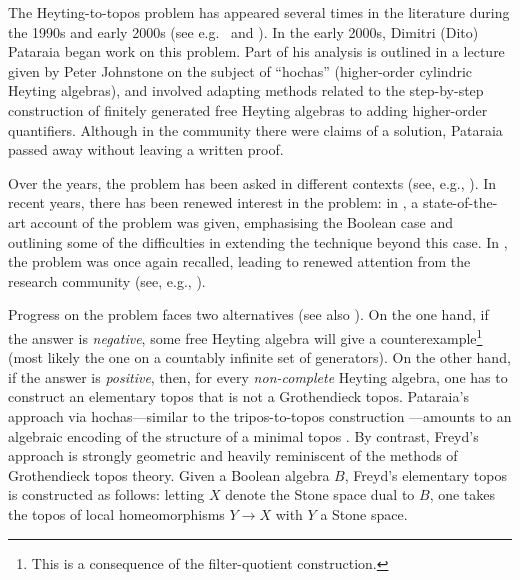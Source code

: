 \documentclass[12pt]{amsart}
\theoremstyle{plain}
\theoremstyle{definition}
\begin{document}
The Heyting-to-topos problem has appeared several times in the literature during the 1990s and early 2000s (see e.g.\ \cite[Introduction]{Ghilardi2002} and \cite{Pitts2002}). 
In the early 2000s, Dimitri (Dito) Pataraia began work on this problem. Part of his analysis is outlined in a lecture given by Peter Johnstone \cite{johnstonehochasminimaltoposes} on the subject of ``hochas'' (higher-order cylindric Heyting algebras), and involved adapting methods related to the step-by-step construction of finitely generated free Heyting algebras \cite{ghilardifreeheyting} to adding higher-order quantifiers. 
Although in the community there were claims of a solution, Pataraia passed away without leaving a written proof.

Over the years, the problem has been asked in different contexts (see, e.g., \cite{Mathoverflow,stackexchange}). 
In recent years, there has been renewed interest in the problem: in \cite{kuznetsovjibladze}, a state-of-the-art account of the problem was given, emphasising the Boolean case and outlining some of the difficulties in extending the technique beyond this case. In \cite{pittshigherorder}, the problem was once again recalled, leading to renewed attention from the research community (see, e.g., \cite[Question~16]{vangooluniforminterpolation}).

Progress on the problem faces two alternatives \cite{pittshigherorder} (see also \cite[Sec.~3.3]{vangooluniforminterpolation}).
On the one hand, if the answer is \emph{negative}, some free Heyting algebra will give a counterexample\footnote{This is a consequence of the filter-quotient construction.} (most likely the one on a countably infinite set of generators). On the other hand, if the answer is \emph{positive}, then, for every \emph{non-complete} Heyting algebra, one has to construct an elementary topos that is not a Grothendieck topos. Pataraia's approach via hochas---similar to the tripos-to-topos construction \cite{Hyland1980,Pitts2002}---amounts to an algebraic encoding of the structure of a minimal topos \cite{johnstonehochasminimaltoposes}. By contrast, Freyd's approach is strongly geometric and heavily reminiscent of the methods of Grothendieck topos theory. Given a Boolean algebra $B$, Freyd's elementary topos is constructed as follows: letting $X$ denote the Stone space dual to $B$, one takes the topos of local homeomorphisms $Y \to X$ with $Y$ a Stone space.
\end{document}
